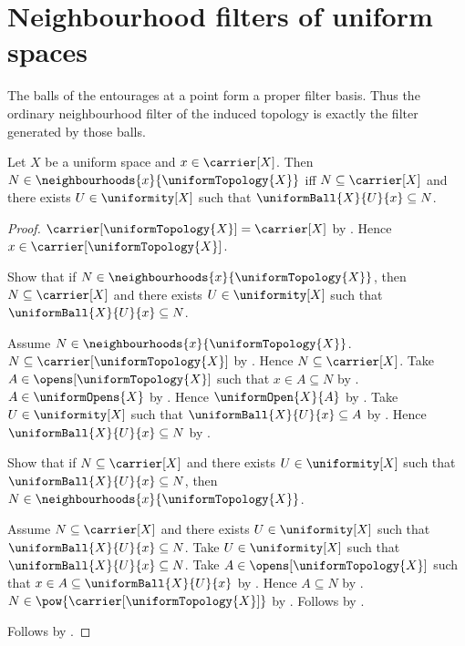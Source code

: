 \section{Neighbourhood filters of uniform spaces}





The balls of the entourages at a point form a proper filter basis.  Thus the
ordinary neighbourhood filter of the induced topology is exactly the filter
generated by those balls.

\begin{theorem}\label{uniform_neighbourhood_iff}
    Let $X$ be a uniform space and $x\in\carrier[X]$.
    Then $N\in\neighbourhoods{x}{\uniformTopology{X}}$ iff
        $N\subseteq\carrier[X]$ and there exists $U\in\uniformity[X]$
        such that $\uniformBall{X}{U}{x}\subseteq N$.
\end{theorem}
\begin{proof}
    $\carrier[\uniformTopology{X}]=\carrier[X]$ by
        .
    Hence $x\in\carrier[\uniformTopology{X}]$.

    Show that if $N\in\neighbourhoods{x}{\uniformTopology{X}}$, then
        $N\subseteq\carrier[X]$ and there exists $U\in\uniformity[X]$
        such that $\uniformBall{X}{U}{x}\subseteq N$.
    \begin{subproof}
        Assume $N\in\neighbourhoods{x}{\uniformTopology{X}}$.
        $N\subseteq\carrier[\uniformTopology{X}]$ by
            .
        Hence $N\subseteq\carrier[X]$.
        Take $A\in\opens[\uniformTopology{X}]$ such that
            $x\in A\subseteq N$ by .
        $A\in\uniformOpens{X}$ by .
        Hence $\uniformOpen{X}{A}$ by .
        Take $U\in\uniformity[X]$ such that
            $\uniformBall{X}{U}{x}\subseteq A$ by
            .
        Hence $\uniformBall{X}{U}{x}\subseteq N$ by
            .
    \end{subproof}

    Show that if $N\subseteq\carrier[X]$ and there exists
        $U\in\uniformity[X]$ such that
        $\uniformBall{X}{U}{x}\subseteq N$, then
        $N\in\neighbourhoods{x}{\uniformTopology{X}}$.
    \begin{subproof}
        Assume $N\subseteq\carrier[X]$ and there exists
            $U\in\uniformity[X]$ such that
            $\uniformBall{X}{U}{x}\subseteq N$.
        Take $U\in\uniformity[X]$ such that
            $\uniformBall{X}{U}{x}\subseteq N$.
        Take $A\in\opens[\uniformTopology{X}]$ such that
            $x\in A\subseteq\uniformBall{X}{U}{x}$ by
            .
        Hence $A\subseteq N$ by .
        $N\in\pow{\carrier[\uniformTopology{X}]}$ by
            .
        Follows by .
    \end{subproof}
    Follows by \auto.
\end{proof}

